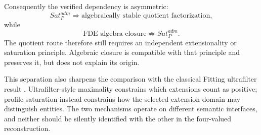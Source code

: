Consequently the verified dependency is asymmetric:
\[
\boxed{
  Sat_P^{adm}
  \Longrightarrow
  \text{algebraically stable quotient factorization},
}
\]
while
\[
\boxed{
  \text{FDE algebra closure}
  \not\Longrightarrow
  Sat_P^{adm}.
}
\]
The quotient route therefore still requires an independent extensionality or saturation principle. Algebraic closure is compatible with that principle and preserves it, but does not explain its origin.

This separation also sharpens the comparison with the classical Fitting ultrafilter result \cite{BenzmuellerFuenmayor2019}. Ultrafilter-style maximality constrains which extensions count as positive; profile saturation instead constrains how the selected extension domain may distinguish entities. The two mechanisms operate on different semantic interfaces, and neither should be silently identified with the other in the four-valued reconstruction.
